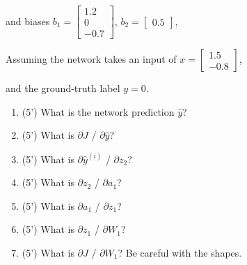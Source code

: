 \documentclass[11pt]{article}\pagestyle{plain}
\begin{document}
and biases
$
b_1=
\begin{bmatrix}
	1.2\\
	0\\
	-0.7
\end{bmatrix}
$,
$
b_2=
\begin{bmatrix}
	0.5
\end{bmatrix}
$, 

Assuming the network takes an input of 
$
x=
\begin{bmatrix}
	1.5\\
	-0.8
\end{bmatrix}
$, 

and the ground-truth label $y=0$.

\begin{enumerate}
	\item (5') What is the network prediction $\hat{y}$?
	\item (5') What is ${\partial J}$ / ${\partial \hat{y}}$?
	\item (5') What is ${\partial \hat{y}^{(i)}}$ / ${\partial z_2}$?
	\item (5') What is ${\partial z_2}$ / ${\partial a_1}$?
	\item (5') What is ${\partial a_1}$ / ${\partial z_1}$?
	\item (5') What is ${\partial z_1}$ / ${\partial W_1}$?
	\item (5') What is ${\partial J}$ / ${\partial W_1}$? Be careful with the shapes. 
\end{enumerate}
\end{document}

